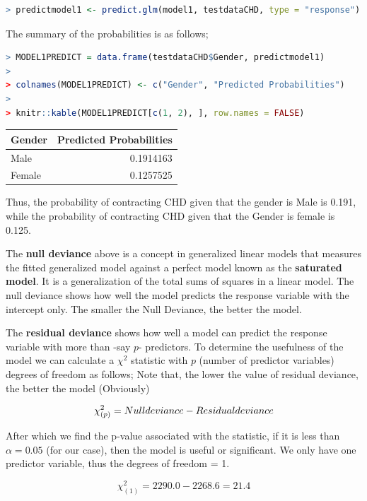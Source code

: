 \documentclass[
]{article}
\begin{document}
\begin{lstlisting}[language=R]
> predictmodel1 <- predict.glm(model1, testdataCHD, type = "response")
\end{lstlisting}

The summary of the probabilities is as follows;

\begin{lstlisting}[language=R]
> MODEL1PREDICT = data.frame(testdataCHD$Gender, predictmodel1)
> 
> colnames(MODEL1PREDICT) <- c("Gender", "Predicted Probabilities")
> 
> knitr::kable(MODEL1PREDICT[c(1, 2), ], row.names = FALSE)
\end{lstlisting}

\begin{longtable}[]{@{}lr@{}}
\toprule()
Gender & Predicted Probabilities \\
\midrule()
\endhead
Male & 0.1914163 \\
Female & 0.1257525 \\
\bottomrule()
\end{longtable}

Thus, the probability of contracting CHD given that the gender is Male
is 0.191, while the probability of contracting CHD given that the Gender
is female is 0.125.

The \textbf{null deviance} above is a concept in generalized linear
models that measures the fitted generalized model against a perfect
model known as the \textbf{saturated model}. It is a generalization of
the total sums of squares in a linear model. The null deviance shows how
well the model predicts the response variable with the intercept only.
The smaller the Null Deviance, the better the model.

The \textbf{residual deviance} shows how well a model can predict the
response variable with more than -say \(p\)- predictors. To determine
the usefulness of the model we can calculate a \(\chi^2\) statistic with
\(p\) (number of predictor variables) degrees of freedom as follows;
Note that, the lower the value of residual deviance, the better the
model (Obviously)

\[\chi^2_{(p)}=Null\space deviance\space -\space Residual\space deviance\]

After which we find the p-value associated with the statistic, if it is
less than \(\alpha=0.05\) (for our case), then the model is useful or
significant. We only have one predictor variable, thus the degrees of
freedom = 1.

\[\chi^2_{(1)}= 2290.0-2268.6=21.4\]
\end{document}
